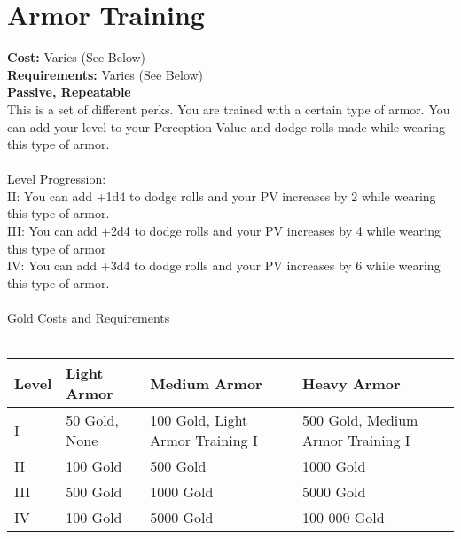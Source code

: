 \section{Armor Training}
\textbf{Cost:} Varies (See Below)\\
\textbf{Requirements:} Varies (See Below)\\
\textbf{Passive, Repeatable}\\
This is a set of different perks. You are trained with a certain type of armor. You can add your level to your Perception Value and dodge rolls made while wearing this type of armor.\\
\\
Level Progression:\\
II: You can add +1d4 to dodge rolls and your PV increases by 2 while wearing this type of armor.\\
III: You can add +2d4 to dodge rolls and your PV increases by 4 while wearing this type of armor\\
IV: You can add +3d4 to dodge rolls and your PV increases by 6 while wearing this type of armor.\\
\\
Gold Costs and Requirements\\
\\
\begin{tabular}{l | p{3.25cm} | p{3.25cm} | p{3.25cm}}
	Level & Light Armor & Medium Armor & Heavy Armor\\ \hline
	I & 50 Gold, None & 100 Gold, Light Armor Training I & 500 Gold, Medium Armor Training I\\
	II & 100 Gold & 500 Gold & 1000 Gold\\
	III & 500 Gold & 1000 Gold & 5000 Gold\\
	IV & 100 Gold & 5000 Gold & 100 000 Gold\\
\end{tabular}